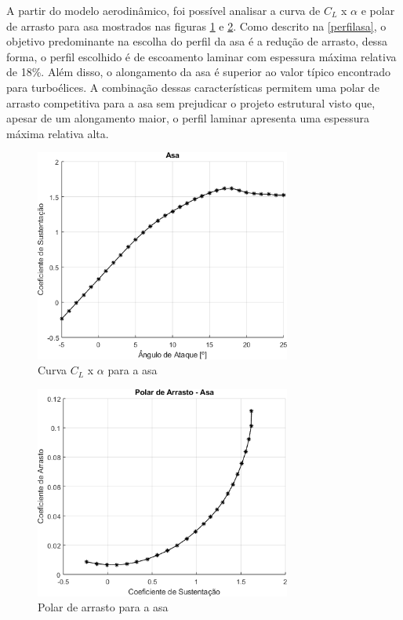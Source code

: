 A partir do modelo aerodinâmico, foi possível analisar a curva de $C_L$ x $\alpha$ e polar de arrasto para asa mostrados nas figuras \ref{fig:asa_cl_alfa} e \ref{fig:asa_cl_cd}. Como descrito na \autoref{perfilasa}, o objetivo predominante na escolha do perfil da asa é a redução de arrasto, dessa forma, o perfil escolhido é de escoamento laminar com espessura máxima relativa de 18\%. Além disso, o alongamento da asa é superior ao valor típico encontrado para turboélices. A combinação dessas características permitem uma polar de arrasto competitiva para a asa sem prejudicar o projeto estrutural visto que, apesar de um alongamento maior, o perfil laminar apresenta uma espessura máxima relativa alta.

\begin{figure}[H]
\centering
\includegraphics[width=0.75\textwidth]{images/parte3/asa_cl_alfa.png}
\caption[Curva $C_L$ x $\alpha$ para a Asa]{Curva $C_L$ x $\alpha$ para a asa}
\label{fig:asa_cl_alfa}
\end{figure}

\begin{figure}[H]
\centering
\includegraphics[width=0.75\textwidth]{images/parte3/asa_cl_cd.png}
\caption[Polar de arrasto para a Asa]{Polar de arrasto para a asa}
\label{fig:asa_cl_cd}
\end{figure}

